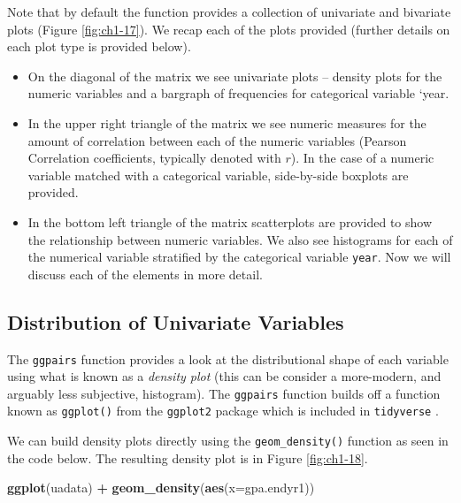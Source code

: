 \documentclass[
]{book}
\newenvironment{Shaded}{\begin{snugshade}}{\end{snugshade}}
\newcommand{\AttributeTok}[1]{\textcolor[rgb]{0.13,0.29,0.53}{#1}}
\newcommand{\FunctionTok}[1]{\textcolor[rgb]{0.13,0.29,0.53}{\textbf{#1}}}
\newcommand{\NormalTok}[1]{#1}
\newcommand{\SpecialCharTok}[1]{\textcolor[rgb]{0.81,0.36,0.00}{\textbf{#1}}}
\providecommand{\tightlist}{%
  \setlength{\itemsep}{0pt}\setlength{\parskip}{0pt}}
\begin{document}
Note that by default the function provides a collection of univariate and bivariate plots (Figure \ref{fig:ch1-17}).
We recap each of the plots provided (further details on each plot type is provided below).

\begin{itemize}
\tightlist
\item
  On the diagonal of the matrix we see univariate plots -- density plots for the numeric variables and a bargraph of frequencies for categorical variable `year.
\item
  In the upper right triangle of the matrix we see numeric measures for the amount of correlation between each of the numeric variables (Pearson Correlation coefficients, typically denoted with \(r\)). In the case of a numeric variable matched with a categorical variable, side-by-side boxplots are provided.
\item
  In the bottom left triangle of the matrix scatterplots are provided to show the relationship between numeric variables. We also see histograms for each of the numerical variable stratified by the categorical variable \texttt{year}. Now we will discuss each of the elements in more detail.
\end{itemize}

\hypertarget{distribution-of-univariate-variables}{%
\subsection{Distribution of Univariate Variables}\label{distribution-of-univariate-variables}}

The \texttt{ggpairs} function provides a look at the distributional shape of each variable using what is known as a \emph{density plot} (this can be consider a more-modern, and arguably less subjective, histogram). The \texttt{ggpairs} function builds off a function known as \texttt{ggplot()} from the \texttt{ggplot2} package \citep{R-ggplot2} which is included in \texttt{tidyverse} \citep{R-tidyverse}.

We can build density plots directly using the \texttt{geom\_density()} function as seen in the code below. The resulting density plot is in Figure \ref{fig:ch1-18}.

\begin{Shaded}
\begin{Highlighting}[]
\FunctionTok{ggplot}\NormalTok{(uadata) }\SpecialCharTok{+} 
  \FunctionTok{geom\_density}\NormalTok{(}\FunctionTok{aes}\NormalTok{(}\AttributeTok{x=}\NormalTok{gpa.endyr1))}
\end{Highlighting}
\end{Shaded}
\end{document}
